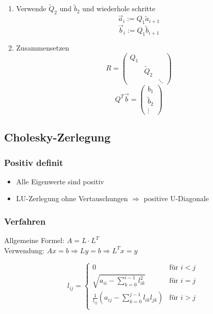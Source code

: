 \begin{enumerate}
	\item Verwende $\widetilde{Q}_2$ und $\widetilde{b}_2$ und wiederhole schritte
	\begin{equation*}
		\vec{a}_i := Q_1\widetilde{a}_{i+1}
	\end{equation*}
	\begin{equation*}
		\vec{b}_i := Q_1\widetilde{b}_{i+1}
	\end{equation*}
	
	\item Zusammensetzen
	\begin{displaymath}
		R =
		\begin{pmatrix}
			Q_1 & & \\
			& \widetilde{Q}_2 & \\
			& & \ddots
		\end{pmatrix}
	\end{displaymath}
	\begin{displaymath}
		Q^T \vec{b} =
		\begin{pmatrix}
			b_1 \\
			\widetilde{b}_2 \\
			\vdots
		\end{pmatrix}
	\end{displaymath}

\end{enumerate}

\subsection{Cholesky-Zerlegung}

\subsubsection*{Positiv definit}
\begin{itemize}
	
	\item Alle Eigenwerte sind positiv
	
	\item LU-Zerlegung ohne Vertauschungen $\Rightarrow$ positive U-Diagonale
	
\end{itemize}

\subsubsection*{Verfahren}
Allgemeine Formel: $A = L \cdot L^T$ \\
Verwendung: $Ax = b \Rightarrow Ly = b \Rightarrow L^Tx = y$

\begin{displaymath}
	l_{ij} =
	\begin{cases}
		0 & \text{für } i<j \\
		\sqrt{a_{ii} - \sum_{k=0}^{i-1}l_{ik}^2} & \text{für } i=j \\
		\frac{1}{l_{ij}} (a_{ij} - \sum_{k=0}^{j-1}l_{ik}l_{jk}) & \text{für } i>j \\
	\end{cases}
\end{displaymath}

